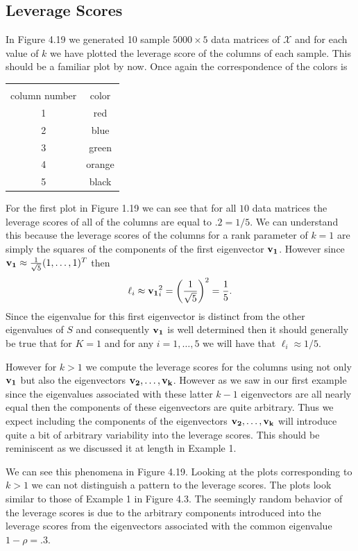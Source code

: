 \documentclass{book}
\newcommand{\bs}[1]{\boldsymbol{#1}}
\newcommand{\rv}[1]{\bs{\mathscr{#1}}}
\begin{document}
\newpage
\subsection{Leverage Scores}

In Figure 4.19 we generated 10 sample $5000 \times 5$ data matrices of $\rv{X}$ and for each value of $k$ we have plotted the leverage score of the columns of each sample. This should be a familiar plot by now. Once again the correspondence of the colors is 

\begin{center}
\begin{tabular}{|c|c|}
\hline&\\
column number& color\\\hline
1& red\\
2& blue\\
3& green\\
4& orange\\
5& black\\\hline
\end{tabular} 
\end{center}

For the first plot in Figure 1.19 we can see that for all $10$ data matrices the leverage scores of all of the columns are equal to $.2=1/5$. We can understand this because the leverage scores of the columns for a rank parameter of $k=1$ are simply the squares of the components of the first eigenvector ${\bf v_1}$. However since ${\bf v_1}\approx\frac{1}{\sqrt{5}}(1,\ldots,1)^T$ then 
$$
\ell_i\approx{\bf v_1}_i^2=\left(\frac{1}{\sqrt{5}}\right)^2=\frac{1}{5}.
$$
Since the eigenvalue for this first eigenvector is distinct from the other eigenvalues of $S$ and consequently ${\bf v_1}$ is well determined then it should generally be true that for $K=1$ and for any $i=1,\ldots,5$ we will have that $\ell_i\approx 1/5$.

However for $k>1$ we compute the leverage scores for the columns using not only ${\bf v_1}$ but also the eigenvectors ${\bf v_2},\ldots,{\bf v_k}$. However as we saw in our first example since the eigenvalues associated with these latter $k-1$ eigenvectors are all nearly equal then the components of these eigenvectors are quite arbitrary. Thus we expect including the components of the eigenvectors ${\bf v_2},\ldots,{\bf v_k}$ will introduce quite a bit of arbitrary variability into the leverage scores. This should be reminiscent as we discussed it at length in Example 1.

We can see this phenomena in Figure 4.19. Looking at the plots corresponding to $k>1$ we can not distinguish a pattern to the leverage scores. The plots look similar to those of Example 1 in Figure 4.3. The seemingly random behavior of the leverage scores is due to the arbitrary components introduced into the leverage scores from the eigenvectors associated with the common eigenvalue $1-\rho=.3$.
\end{document}
